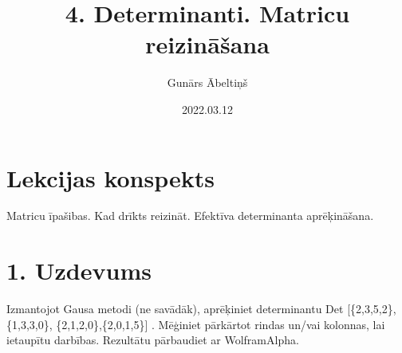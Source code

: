\documentclass{article}
\title{4. Determinanti. Matricu reizināšana}
\author{Gunārs Ābeltiņš}
\date{2022.03.12}
\begin{document}
\maketitle

\section*{Lekcijas konspekts}
Matricu īpašibas. Kad drīkts reizināt. Efektīva determinanta aprēķināšana.

\clearpage

\section*{1. Uzdevums}
Izmantojot Gausa metodi (ne savādāk), aprēķiniet determinantu Det [\{2,3,5,2\}, \{1,3,3,0\}, \{2,1,2,0\},\{2,0,1,5\}] . Mēģiniet pārkārtot rindas un/vai kolonnas, lai ietaupītu darbības. Rezultātu pārbaudiet ar WolframAlpha.
\end{document}
